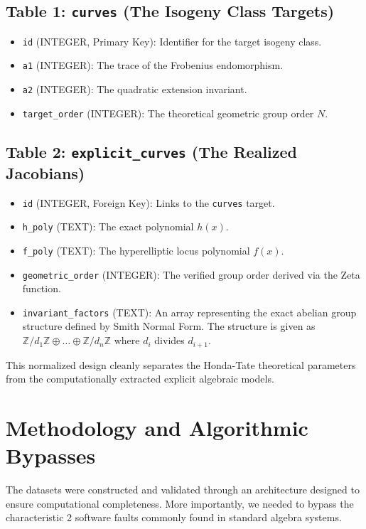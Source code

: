 \documentclass[letterpaper, 11pt]{article}
\begin{document}
\subsection{Table 1: \texttt{curves} (The Isogeny Class Targets)}
\begin{itemize}
    \item \texttt{id} (INTEGER, Primary Key): Identifier for the target isogeny class.
    \item \texttt{a1} (INTEGER): The trace of the Frobenius endomorphism.
    \item \texttt{a2} (INTEGER): The quadratic extension invariant.
    \item \texttt{target\_order} (INTEGER): The theoretical geometric group order $N$.
\end{itemize}

\subsection{Table 2: \texttt{explicit\_curves} (The Realized Jacobians)}
\begin{itemize}
    \item \texttt{id} (INTEGER, Foreign Key): Links to the \texttt{curves} target.
    \item \texttt{h\_poly} (TEXT): The exact polynomial $h(x)$.
    \item \texttt{f\_poly} (TEXT): The hyperelliptic locus polynomial $f(x)$.
    \item \texttt{geometric\_order} (INTEGER): The verified group order derived via the Zeta function.
    \item \texttt{invariant\_factors} (TEXT): An array representing the exact abelian group structure defined by Smith Normal Form. The structure is given as $\mathbb{Z}/d_1\mathbb{Z} \oplus \dots \oplus \mathbb{Z}/d_n\mathbb{Z}$ where $d_i$ divides $d_{i+1}$.
\end{itemize}
This normalized design cleanly separates the Honda-Tate theoretical parameters from the computationally extracted explicit algebraic models.

\section{Methodology and Algorithmic Bypasses}
The datasets were constructed and validated through an architecture designed to ensure computational completeness. More importantly, we needed to bypass the characteristic 2 software faults commonly found in standard algebra systems.
\end{document}
